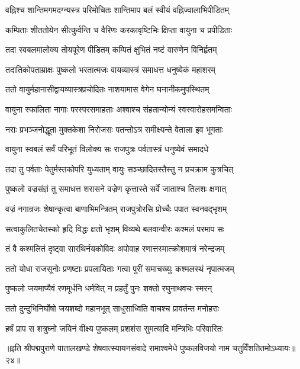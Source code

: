 \twolineshloka
{वह्निश्च शान्तिमगमदग्न्यस्त्र परिमोचितः}
{शान्तिमाप बलं स्वीयं वह्निज्वालाभिपीडितम्}%

\twolineshloka
{कम्पिताः शीततोयेन सीत्कुर्वन्ति च वैरिणः}
{करकावृष्टिभिः क्षिप्ता वायुना च प्रपीडिताः}%

\twolineshloka
{तदा स्वबलमालोक्य तोयपूरेण पीडितम्}
{कम्पितं क्षुभितं नष्टं वारुणेन विनिर्हृतम्}%

\twolineshloka
{तदातिकोपताम्राक्षः पुष्कलो भरतात्मजः}
{वायव्यास्त्रं समाधत्त धनुष्येकं महाशरम्}%

\twolineshloka
{ततो वायुर्महानासीद्वायव्यास्त्रप्रचोदितः}
{नाशयामास वेगेन घनानीकमुपस्थितम्}%

\twolineshloka
{वायुना स्फालिता नागाः परस्परसमाहताः}
{अश्वाश्च संहतान्योन्यं स्वस्वारोहसमन्विताः}%

\twolineshloka
{नराः प्रभञ्जनोद्धूता मुक्तकेशा निरोजसः}
{पतन्तोऽत्र समीक्ष्यन्ते वेताला इव भूगताः}%

\twolineshloka
{वायुना स्वबलं सर्वं परिभूतं विलोक्य सः}
{राजपुत्रः पर्वतास्त्रं धनुष्येवं समादधे}%

\twolineshloka
{तदा तु पर्वताः पेतुर्मस्तकोपरि युध्यताम्}
{वायुः सञ्च्छादितस्तैस्तु न प्रचक्राम कुत्रचित्}%

\twolineshloka
{पुष्कलो वज्रसंज्ञं तु समाधत्त शरासने}
{वज्रेण कृत्तास्ते सर्वे जाताश्च तिलशः क्षणात्}%

\twolineshloka
{वज्रं नगान्रजः शेषान्कृत्वा बाणाभिमन्त्रितम्}
{राजपुत्रोरसि प्रोच्चैः पपात स्वनवद्भृशम्}%

\twolineshloka
{सत्वाकुलितचेतस्को हृदि विद्धः क्षतो भृशम्}
{विव्यथे बलवान्वीरः कश्मलं परमाप सः}%

\twolineshloka
{तं वै कश्मलितं दृष्ट्वा सारथिर्नयकोविदः}
{अपोवाह रणात्तस्मात्क्रोशमात्रं नरेन्द्रजम्}%

\twolineshloka
{ततो योधा राजसूनोः प्रणष्टाः प्रपलायिताः}
{गत्वा पुरीं समाचख्युः कश्मलस्थं नृपात्मजम्}%

\twolineshloka
{पुष्कलो जयमाप्यैवं रणमूर्धनि धर्मवित्}
{न प्रहर्तुं पुनः शक्तो रघुनाथवचः स्मरन्}%

\twolineshloka
{ततो दुन्दुभिनिर्घोषो जयशब्दो महानभूत्}
{साधुसाध्विति वाचश्च प्रावर्तन्त मनोहराः}%

\twolineshloka
{हर्षं प्राप स शत्रुघ्नो जयिनं वीक्ष्य पुष्कलम्}
{प्रशशंस सुमत्यादि मन्त्रिभिः परिवारितः}%

{॥इति श्रीपद्मपुराणे पातालखण्डे शेषवात्स्यायनसंवादे रामाश्वमेधे पुष्कलविजयो नाम चतुर्विंशतितमोऽध्यायः॥२४॥}

